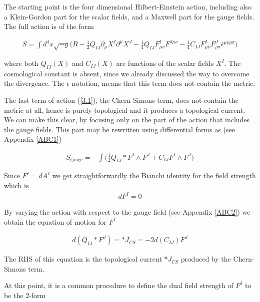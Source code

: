 \documentclass[a4paper,notitlepage]{report}
\begin{document}
The starting point is the four dimensional Hilbert-Einstein action, including also a Klein-Gordon part for the scalar fields, and a Maxwell part for the gauge fields. The full action is of the form:

\begin{align} \label{3.1}
S = \int d^4x \sqrt{-g} \Big( R - \frac{1}{2} Q_{IJ} \partial_\mu X^I \partial^\mu X^J - \frac{1}{4} Q_{IJ} F^I_{\mu\nu} F^{J\mu\nu} - \frac{1}{4} C_{IJ} F^I_{\mu\nu} F^J_{\rho\sigma} \bar\epsilon^{\mu\nu\rho\sigma} \Big)
\end{align}

\vspace{0.5 em}
where both $Q_{IJ}(X)$ and $C_{IJ}(X)$ are functions of the scalar fields $X^I$. The cosmological constant is absent, since we already discussed the way to overcome the divergence. The $\bar\epsilon$ notation, means that this term does not contain the metric.

The last term of action (\ref{3.1}), the Chern-Simons term, does not contain the metric at all, hence is purely topological and it produces a topological current. We can make this clear, by focusing only on the part of the action that includes the gauge fields. This part may be rewritten using differential forms as (see Appendix \ref{ABC1})

\begin{align} \label{3.2}
S_{\text{gauge}} = - \int \Big( \frac{1}{2} Q_{IJ} *F^I \wedge F^J + C_{IJ} F^I \wedge F^J \Big)
\end{align}

\vspace{0.5 em}
Since $F^I = dA^I$ we get straightforwardly the Bianchi identity for the field strength which is
\begin{align} \label{3.3}
dF^I = 0
\end{align}

\vspace{0.5 em}
By varying the action with respect to the gauge field (see Appendix  \ref{ABC2}) we obtain the equation of motion for $F^I$ 

\begin{align} \label{3.4}
d(Q_{IJ} * F^J ) = *J_{CS} = - 2 d(C_{IJ}) F^J 
\end{align}

\vspace{0.5 em}
The RHS of this equation is the topological current $*J_{CS}$ produced by the Chern-Simons term.

At this point, it is a common procedure to define the dual field strength of $F^I$ to be the 2-form 
\end{document}

